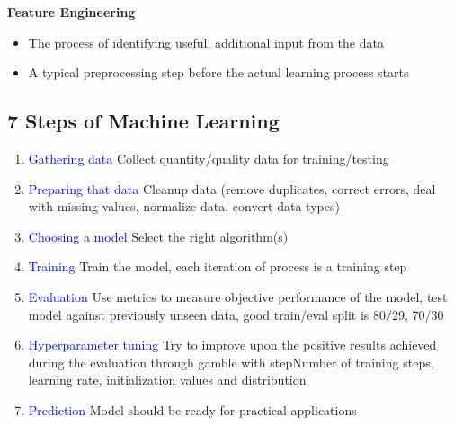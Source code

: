 \textbf{Feature Engineering}
\begin{itemize}
    \item The process of identifying useful, additional input from the data
    \item A typical preprocessing step before the actual learning process starts
\end{itemize}

\subsection{7 Steps of Machine Learning}
\begin{enumerate}
    \item \textcolor{blue}{Gathering data} Collect quantity/quality data for training/testing
    \item \textcolor{blue}{Preparing that data} Cleanup data (remove duplicates, correct errors, deal with missing values, normalize data, convert data types)
    \item \textcolor{blue}{Choosing a model} Select the right algorithm(s)
    \item \textcolor{blue}{Training} Train the model, each iteration of process is a training step
    \item \textcolor{blue}{Evaluation} Use metrics to measure objective performance of the model, test model against previously unseen data, good train/eval split is 80/29, 70/30
    \item \textcolor{blue}{Hyperparameter tuning} Try to improve upon the positive results achieved during the evaluation through gamble with stepNumber of training steps, learning rate, initialization values and distribution
    \item \textcolor{blue}{Prediction} Model should be ready for practical applications
\end{enumerate}
